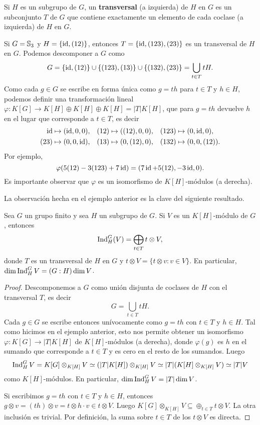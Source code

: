 Si $H$ es un subgrupo de $G$, un \textbf{transversal} (a izquierda) 
de $H$ en $G$ es un subconjunto $T$ de $G$ que contiene exactamente un elemento de cada coclase (a izquierda) 
de $H$ en $G$. 

\begin{example}
Si $G=\mathbb{S}_3$ y $H=\{\operatorname{id},(12)\}$, entonces
$T=\{\operatorname{id},(123),(23)\}$ es un transversal de $H$ en $G$. Podemos descomponer 
a $G$ como
\[
G=\{\operatorname{id},(12)\}\cup \{(123),(13)\}\cup\{(132),(23)\}=\bigcup_{t\in T}tH.
\]
Como cada $g\in G$ se escribe en forma única como $g=th$ para $t\in T$ y $h\in H$, podemos 
definir una transformación lineal 
$\varphi\colon K[G]\to K[H]\oplus K[H]\oplus K[H]=|T|K[H]$, que para $g=th$ devuelve $h$ en el lugar que corresponde a $t\in T$, es decir
\begin{align*}
\operatorname{id}&\mapsto (\operatorname{id},0,0), && (12)\mapsto ((12),0,0), && (123)\mapsto (0,\operatorname{id},0),\\
(23)&\mapsto (0,0,\operatorname{id}), && (13)\mapsto (0,(12),0), && (132)\mapsto (0,0,(12)).
\end{align*}
Por ejemplo, 
\[
\varphi( 5(12)-3(123)+7\operatorname{id} )=(7\operatorname{id}+5(12),-3\operatorname{id},0).
\]
Es importante observar que $\varphi$ es un isomorfismo de $K[H]$-módulos (a derecha). 
\end{example}

La observación hecha en el ejemplo anterior es la clave del siguiente resultado.

\begin{proposition}
Sea $G$ un grupo finito y sea 
$H$ un subgrupo de $G$. Si $V$ es un $K[H]$-módulo de $G$, entonces 
\[
    \operatorname{Ind}_H^G(V)=\bigoplus_{t\in T}t\otimes V,
\]
donde $T$ es un transversal de $H$ en $G$ y $t\otimes V=\{t\otimes v:v\in V\}$. En particular, 
$\dim\operatorname{Ind}_H^GV=(G:H)\dim V$.
\end{proposition}

\begin{proof}
Descomponemos a $G$ como unión disjunta de coclases de $H$ con el transversal $T$, es decir
\[
G=\bigcup_{t\in T}tH.
\]
Cada $g\in G$ se escribe entonces unívocamente como $g=th$ con $t\in T$ y $h\in H$. Tal como 
hicimos en el ejemplo anterior, esto nos permite obtener un isomorfismo 
$\varphi\colon K[G]\to |T|K[H]$ de $K[H]$-módulos (a derecha), donde $\varphi(g)$ es $h$ en el sumando que corresponde a $t\in T$
y es cero en el resto de los sumandos. Luego
\[
\operatorname{Ind}_H^GV=K[G]\otimes_{K[H]}V\simeq (|T|K[H])\otimes_{K[H]}V\simeq |T|(K[H]\otimes_{K[H]}V)\simeq |T|V
\]
como $K[H]$-módulos. En particular, $\dim\operatorname{Ind}_H^GV=|T|\dim V$. 

Si escribimos $g=th$ con $t\in T$ y $h\in H$, entonces $g\otimes v=(th)\otimes v=t\otimes h\cdot v\in t\otimes V$. 
Luego $K[G]\otimes_{K[H]}V\subseteq \oplus_{t\in T}t\otimes V$. La otra inclusión es trivial. Por definición, 
la suma sobre $t\in T$ de los $t\otimes V$ es directa. 
\end{proof}

